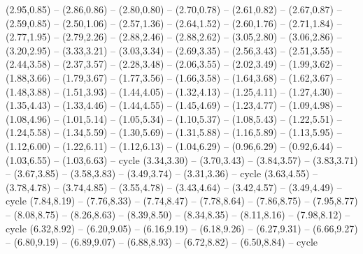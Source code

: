 {(2.95,0.85) -- (2.86,0.86) -- (2.80,0.80) -- (2.70,0.78) -- (2.61,0.82) -- (2.67,0.87) -- (2.59,0.85) -- (2.50,1.06) -- (2.57,1.36) -- (2.64,1.52) -- (2.60,1.76) -- (2.71,1.84) -- (2.77,1.95) -- (2.79,2.26) -- (2.88,2.46) -- (2.88,2.62) -- (3.05,2.80) -- (3.06,2.86) -- (3.20,2.95) -- (3.33,3.21) -- (3.03,3.34) -- (2.69,3.35) -- (2.56,3.43) -- (2.51,3.55) -- (2.44,3.58) -- (2.37,3.57) -- (2.28,3.48) -- (2.06,3.55) -- (2.02,3.49) -- (1.99,3.62) -- (1.88,3.66) -- (1.79,3.67) -- (1.77,3.56) -- (1.66,3.58) -- (1.64,3.68) -- (1.62,3.67) -- (1.48,3.88) -- (1.51,3.93) -- (1.44,4.05) -- (1.32,4.13) -- (1.25,4.11) -- (1.27,4.30) -- (1.35,4.43) -- (1.33,4.46) -- (1.44,4.55) -- (1.45,4.69) -- (1.23,4.77) -- (1.09,4.98) -- (1.08,4.96) -- (1.01,5.14) -- (1.05,5.34) -- (1.10,5.37) -- (1.08,5.43) -- (1.22,5.51) -- (1.24,5.58) -- (1.34,5.59) -- (1.30,5.69) -- (1.31,5.88) -- (1.16,5.89) -- (1.13,5.95) -- (1.12,6.00) -- (1.22,6.11) -- (1.12,6.13) -- (1.04,6.29) -- (0.96,6.29) -- (0.92,6.44) -- (1.03,6.55) -- (1.03,6.63) -- cycle
  (3.34,3.30) -- (3.70,3.43) -- (3.84,3.57) -- (3.83,3.71) -- (3.67,3.85) -- (3.58,3.83) -- (3.49,3.74) -- (3.31,3.36) -- cycle
  (3.63,4.55) -- (3.78,4.78) -- (3.74,4.85) -- (3.55,4.78) -- (3.43,4.64) -- (3.42,4.57) -- (3.49,4.49) -- cycle
  (7.84,8.19) -- (7.76,8.33) -- (7.74,8.47) -- (7.78,8.64) -- (7.86,8.75) -- (7.95,8.77) -- (8.08,8.75) -- (8.26,8.63) -- (8.39,8.50) -- (8.34,8.35) -- (8.11,8.16) -- (7.98,8.12) -- cycle
  (6.32,8.92) -- (6.20,9.05) -- (6.16,9.19) -- (6.18,9.26) -- (6.27,9.31) -- (6.66,9.27) -- (6.80,9.19) -- (6.89,9.07) -- (6.88,8.93) -- (6.72,8.82) -- (6.50,8.84) -- cycle}
